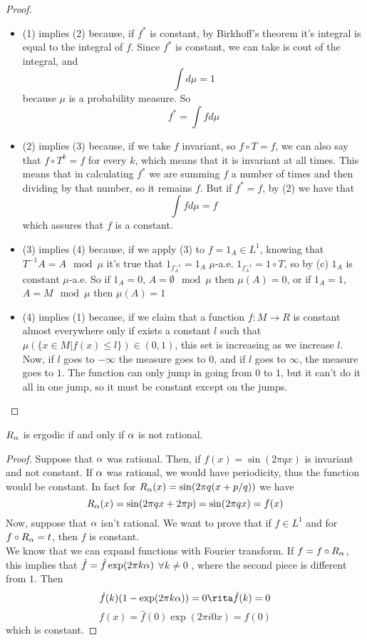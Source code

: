 \begin{proof}
	\begin{itemize}
		\item (1) implies (2) because, if $f^*$ is constant, by Birkhoff's theorem it's integral is equal to the integral of $f$. Since $f^*$ is constant, we can take is cout of the integral, and 
			$$
				\int d\mu = 1
			$$
			because $\mu$ is a probability measure. So
			$$
				f^* = \int f d\mu
			$$
		\item (2) implies (3) because, if we take $f$ invariant, so $f\circ T = f$, we can also say that $f\circ T^k = f$ for every $k$, which means that it is invariant at all times. This means that in calculating $f^*$ we are summing $f$ a number of times and then dividing by that number, so it remains $f$. But if $f^* = f$, by (2) we have that
			$$
				\int f d\mu = f
			$$
			which assures that $f$ is a constant.
		\item (3) implies (4) because, if we apply (3) to $f=1_A \in L^1$, knowing that $T^{-1}A=A \mod\mu$ it's true that $1_{f^{-1}_A}=1_A$ $\mu$-a.e.
			$1_{f^{-1}_A} = 1 \circ T$, so by (c) $1_A$ is constant $\mu$-a.e.
			So if $1_A = 0$, $A=\emptyset\mod\mu$ then $\mu(A)=0$, or if $1_A=1$, $A=M\mod\mu$ then $\mu(A)=1$
		\item (4) implies (1) because, if we claim that a function $f:M \rightarrow R$ is constant almost everywhere only if exists a constant $l$ such that $\mu(\{x\in M | f(x) \leq l\})\in (0,1)$, this set is increasing as we increase $l$. Now, if $l$ goes to $-\infty$ the measure goes to $0$, and if $l$ goes to $\infty$, the measure goes to $1$. The function can only jump in going from $0$ to $1$, but it can't do it all in one jump, so it must be constant except on the jumps.
	\end{itemize}	
\end{proof}
\begin{prop}
	$R_\alpha$ is ergodic if and only if $\alpha$ is not rational.	
\end{prop}
\begin{proof}
	Suppose that $\alpha$ was rational. Then, if $f(x) = \sin(2\pi q x)$ is invariant and not constant. If $\alpha$ was rational, we would have periodicity, thus the function would be constant. In fact for $R_\alpha(x) = \sin(2\pi q (x + p/q))$ we have
	$$
		R_\alpha(x) = \sin(2\pi q x + 2\pi p) = \sin(2\pi q x) = f(x)
	$$
	Now, suppose that $\alpha$ isn't rational. We want to prove that if $f\in L^1$ and for $f \circ R_\alpha = t$, then $f$ is constant. \\
	We know that we can expand functions with Fourier transform. If $f = f \circ R_\alpha$, this implies that $\hat{f} = \hat{f}\exp(2\pi k \alpha)$ $\forall k \neq 0$ , where the second piece is different from $1$. Then
	$$
		\hat{f}(k)(1-\exp(2\pi k \al)) = 0 \rita \hat{f}(k) = 0 
	$$
	$$
		f(x) = \hat{f}(0)\exp(2\pi i 0 x) = \hat{f}(0)
	$$
	which is constant.
\end{proof}
